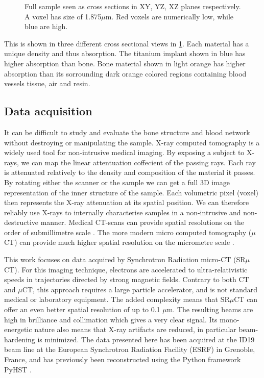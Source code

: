 \begin{figure}
\caption{Full sample seen as cross sections in XY, YZ, XZ planes respectively. A voxel has size of
1.875$\mu$m. Red voxels are numerically low, while blue are high.}
\label{fig:3viewsample}
\end{figure}

This is shown in three different cross sectional views
in \cref{fig:3viewsample}. Each material has a unique density and thus absorption. The titanium
implant shown in blue has higher absorption than bone. Bone material shown in light orange has
higher absorption than its sorrounding dark orange colored regions containing blood vessels
tissue, air and resin.

\subsection{Data acquisition}

It can be difficult to study and evaluate the bone structure and blood network without destroying
or manipulating the sample. X-ray computed tomography is a widely used tool for non-intrusive medical
imaging. By exposing a subject to X-rays, we can map the linear attentuation coffecient of the passing
rays. Each ray is attenuated relatively to the density and composition of the material it passes.
By rotating either the scanner or the sample we can get a full 3D image representation of the inner
structure of the sample. Each volumetric pixel (voxel) then represents the X-ray attenuation at its
spatial position. We can therefore reliably use X-rays to internally characterise samples in a
non-intrusive and non-destructive manner. Medical CT-scans can provide spatial resolutions on the
order of submillimetre scale \citep{medicalct}. The more modern micro computed tomography ($\mu$CT)
can provide much higher spatial resolution on the micrometre scale \citep{srexptime}.

This work focuses on data acquired by Synchrotron Radiation micro-CT (SR$\mu$CT). For this imaging
technique, electrons are accelerated to ultra-relativistic speeds in trajectories directed by strong
magnetic fields. Contrary to both CT and $\mu$CT, this approach requires a large particle accelerator,
and is not standard medical or laboratory equipment. The added complexity means that SR$\mu$CT can
offer an even better spatial resolution of up to 0.1 $\mu$m. The resulting beams are high in
brilliance and collimation which gives a very clear signal. Its mono-energetic nature also means
that X-ray artifacts are reduced, in particular beam-hardening is minimized.
The data presented here has been
acquired at the ID19 beam line at the European Synchrotron Radiation Facility (ESRF) in Grenoble,
France, and has previously  been reconstructed using the Python
framework PyHST \citep{pyhst}.

